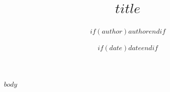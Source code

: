 \documentclass[11pt]{article}
\title{$title$}
\author{$if(author)$$author$$endif$}
\date{$if(date)$$date$$endif$}
\begin{document}
\maketitle
$body$
\end{document}
